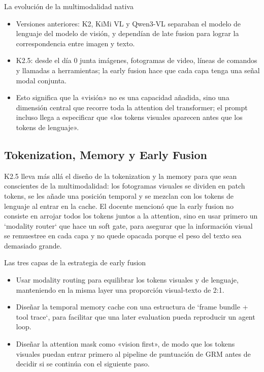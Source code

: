 \documentclass[a4paper]{article}
\begin{document}
\begin{importantbox}{La evolución de la multimodalidad nativa}
\begin{itemize}
    \item Versiones anteriores: K2, KiMi VL y Qwen3-VL separaban el modelo de lenguaje del modelo de visión, y dependían de late fusion para lograr la correspondencia entre imagen y texto.
    \item K2.5: desde el día 0 junta imágenes, fotogramas de video, líneas de comandos y llamadas a herramientas; la early fusion hace que cada capa tenga una señal modal conjunta.
    \item Esto significa que la «visión» no es una capacidad añadida, sino una dimensión central que recorre toda la attention del transformer; el prompt incluso llega a especificar que «los tokens visuales aparecen antes que los tokens de lenguaje».
\end{itemize}
\end{importantbox}

\subsection{Tokenization, Memory y Early Fusion}
K2.5 lleva más allá el diseño de la tokenization y la memory para que sean conscientes de la multimodalidad: los fotogramas visuales se dividen en patch tokens, se les añade una posición temporal y se mezclan con los tokens de lenguaje al entrar en la cache. El docente mencionó que la early fusion no consiste en arrojar todos los tokens juntos a la attention, sino en usar primero un `modality router` que hace un soft gate, para asegurar que la información visual se remuestree en cada capa y no quede opacada porque el peso del texto sea demasiado grande.

\begin{knowledgebox}{Las tres capas de la estrategia de early fusion}
\begin{itemize}
    \item Usar modality routing para equilibrar los tokens visuales y de lenguaje, manteniendo en la misma layer una proporción visual-texto de 2:1.
    \item Diseñar la temporal memory cache con una estructura de `frame bundle + tool trace`, para facilitar que una later evaluation pueda reproducir un agent loop.
    \item Diseñar la attention mask como «vision first», de modo que los tokens visuales puedan entrar primero al pipeline de puntuación de GRM antes de decidir si se continúa con el siguiente paso.
\end{itemize}
\end{knowledgebox}
\end{document}
